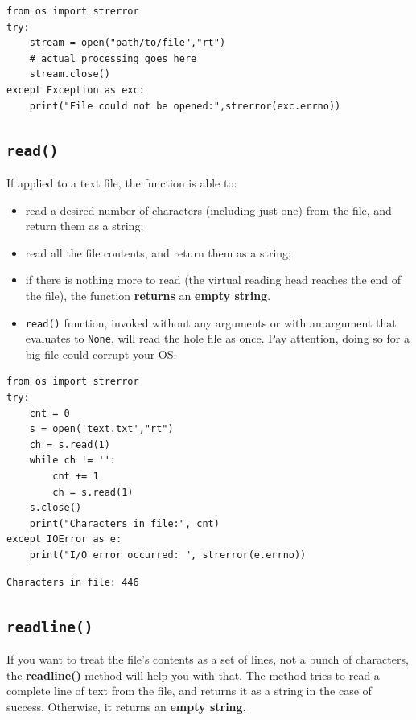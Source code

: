 \documentclass[11pt]{article}
\begin{document}
\begin{verbatim}
from os import strerror
try: 
	stream = open("path/to/file","rt")
	# actual processing goes here
	stream.close()
except Exception as exc:
	print("File could not be opened:",strerror(exc.errno))
\end{verbatim}

\subsection{\texttt{read()}}
\label{sec:orgf4b3b6e}
If applied to a text file, the function is able to:

\begin{itemize}
\item read a desired number of characters (including just one) from the
file, and return them as a string;
\item read all the file contents, and return them as a string;
\item if there is nothing more to read (the virtual reading head reaches
the end of the file), the function \textbf{returns} an \textbf{empty string}.
\item \texttt{read()} function, invoked without any arguments or with an argument
that evaluates to \texttt{None}, will read the hole file as once. Pay
attention, doing so for a big file could corrupt your OS.
\end{itemize}


\begin{verbatim}
from os import strerror
try:
	cnt = 0
	s = open('text.txt',"rt")
	ch = s.read(1)
	while ch != '':
		cnt += 1
		ch = s.read(1)
	s.close()
	print("Characters in file:", cnt)
except IOError as e:
	print("I/O error occurred: ", strerror(e.errno))
\end{verbatim}

\begin{verbatim}
Characters in file: 446
\end{verbatim}

\subsection{\texttt{readline()}}
\label{sec:org4290d15}
If you want to treat the file’s contents as a set of lines, not a
bunch of characters, the \textbf{readline()} method will help you with that.
The method tries to read a complete line of text from the file, and
returns it as a string in the case of success. Otherwise, it returns
an \textbf{empty string.}
\end{document}
